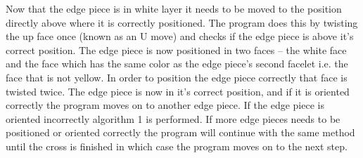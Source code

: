 Now that the edge piece is in white layer it needs to be moved to the position directly above where it is correctly positioned. 
The program does this by twisting the up face once (known as an U move) and checks if the edge piece is above it's correct position.
The edge piece is now positioned in two faces -- the white face and the face which has the same color as the edge piece's second facelet i.e. the face that is not yellow.
In order to position the edge piece correctly that face is twisted twice.
The edge piece is now in it's correct position, and if it is oriented correctly the program moves on to another edge piece.
If the edge piece is oriented incorrectly algorithm 1 is performed. If more edge pieces needs to be positioned or oriented correctly the program will continue with the same method until the cross is finished in which case the program moves on to the next step.

